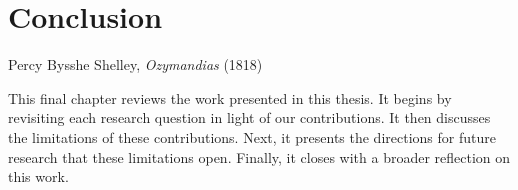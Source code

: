 \chapter{Conclusion}
\label{chap:conclusion}

{Percy Bysshe Shelley, \textit{Ozymandias} (1818)~\parencite{shelley1818ozymandias}}

\chaptercontents

\glsresetall

This final chapter reviews the work presented in this thesis.
It begins by revisiting each research question in light of our contributions.
It then discusses the limitations of these contributions.
Next, it presents the directions for future research that these limitations open.
Finally, it closes with a broader reflection on this work.





